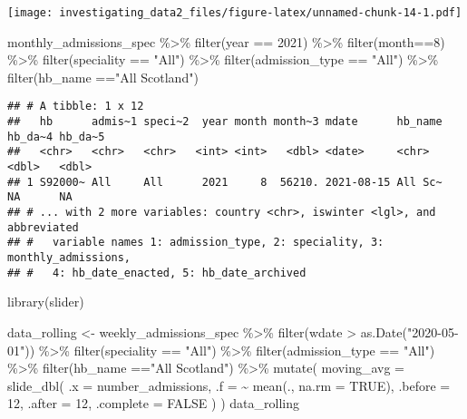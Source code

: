 \documentclass[
]{article}
\newenvironment{Shaded}{\begin{snugshade}}{\end{snugshade}}
\newcommand{\AttributeTok}[1]{\textcolor[rgb]{0.77,0.63,0.00}{#1}}
\newcommand{\ConstantTok}[1]{\textcolor[rgb]{0.00,0.00,0.00}{#1}}
\newcommand{\DecValTok}[1]{\textcolor[rgb]{0.00,0.00,0.81}{#1}}
\newcommand{\FunctionTok}[1]{\textcolor[rgb]{0.00,0.00,0.00}{#1}}
\newcommand{\NormalTok}[1]{#1}
\newcommand{\OtherTok}[1]{\textcolor[rgb]{0.56,0.35,0.01}{#1}}
\newcommand{\SpecialCharTok}[1]{\textcolor[rgb]{0.00,0.00,0.00}{#1}}
\newcommand{\StringTok}[1]{\textcolor[rgb]{0.31,0.60,0.02}{#1}}
\begin{document}
\texttt{[image: investigating\_data2\_files/figure-latex/unnamed-chunk-14-1.pdf]}

\begin{Shaded}
\begin{Highlighting}[]
\NormalTok{monthly\_admissions\_spec }\SpecialCharTok{\%\textgreater{}\%} 
\FunctionTok{filter}\NormalTok{(year }\SpecialCharTok{==} \DecValTok{2021}\NormalTok{) }\SpecialCharTok{\%\textgreater{}\%} 
\FunctionTok{filter}\NormalTok{(month}\SpecialCharTok{==}\DecValTok{8}\NormalTok{) }\SpecialCharTok{\%\textgreater{}\%} 
  \FunctionTok{filter}\NormalTok{(speciality }\SpecialCharTok{==} \StringTok{"All"}\NormalTok{) }\SpecialCharTok{\%\textgreater{}\%} 
  \FunctionTok{filter}\NormalTok{(admission\_type }\SpecialCharTok{==} \StringTok{"All"}\NormalTok{) }\SpecialCharTok{\%\textgreater{}\%} 
  \FunctionTok{filter}\NormalTok{(hb\_name }\SpecialCharTok{==}\StringTok{"All Scotland"}\NormalTok{) }
\end{Highlighting}
\end{Shaded}

\begin{verbatim}
## # A tibble: 1 x 12
##   hb      admis~1 speci~2  year month month~3 mdate      hb_name hb_da~4 hb_da~5
##   <chr>   <chr>   <chr>   <int> <int>   <dbl> <date>     <chr>     <dbl>   <dbl>
## 1 S92000~ All     All      2021     8  56210. 2021-08-15 All Sc~      NA      NA
## # ... with 2 more variables: country <chr>, iswinter <lgl>, and abbreviated
## #   variable names 1: admission_type, 2: speciality, 3: monthly_admissions,
## #   4: hb_date_enacted, 5: hb_date_archived
\end{verbatim}

\begin{Shaded}
\begin{Highlighting}[]
\FunctionTok{library}\NormalTok{(slider)}

\NormalTok{data\_rolling }\OtherTok{\textless{}{-}}\NormalTok{ weekly\_admissions\_spec }\SpecialCharTok{\%\textgreater{}\%} 
  \FunctionTok{filter}\NormalTok{(wdate }\SpecialCharTok{\textgreater{}} \FunctionTok{as.Date}\NormalTok{(}\StringTok{"2020{-}05{-}01"}\NormalTok{)) }\SpecialCharTok{\%\textgreater{}\%} 
  \FunctionTok{filter}\NormalTok{(speciality }\SpecialCharTok{==} \StringTok{"All"}\NormalTok{) }\SpecialCharTok{\%\textgreater{}\%} 
  \FunctionTok{filter}\NormalTok{(admission\_type }\SpecialCharTok{==} \StringTok{"All"}\NormalTok{) }\SpecialCharTok{\%\textgreater{}\%} 
  \FunctionTok{filter}\NormalTok{(hb\_name }\SpecialCharTok{==}\StringTok{"All Scotland"}\NormalTok{) }\SpecialCharTok{\%\textgreater{}\%}  
  \FunctionTok{mutate}\NormalTok{(}
    \AttributeTok{moving\_avg =} \FunctionTok{slide\_dbl}\NormalTok{(}
      \AttributeTok{.x =}\NormalTok{ number\_admissions, }
      \AttributeTok{.f =} \SpecialCharTok{\textasciitilde{}} \FunctionTok{mean}\NormalTok{(., }\AttributeTok{na.rm =} \ConstantTok{TRUE}\NormalTok{),}
      \AttributeTok{.before =} \DecValTok{12}\NormalTok{,}
      \AttributeTok{.after =} \DecValTok{12}\NormalTok{,}
      \AttributeTok{.complete =} \ConstantTok{FALSE}
\NormalTok{    )}
\NormalTok{  )}
\NormalTok{data\_rolling}
\end{Highlighting}
\end{Shaded}
\end{document}
